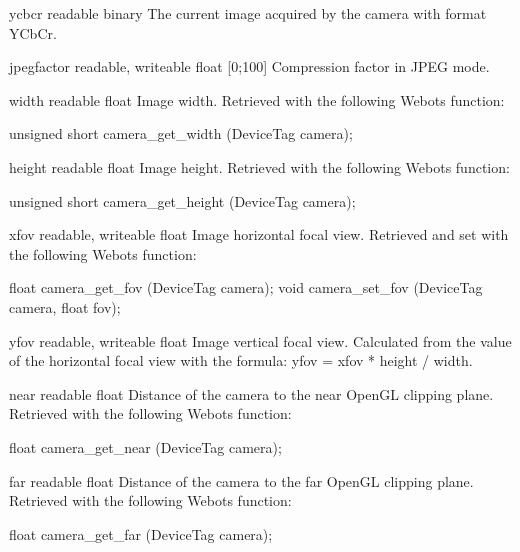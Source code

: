 \begin{itemize}
\begin{attribute}{ycbcr}
  {readable}
  {binary}
  {}
  The current image acquired by the camera with format
  YCbCr.
\end{attribute}

\begin{attribute}{jpegfactor}
  {readable, writeable}
  {float}
  {[0;100]}
  Compression factor in JPEG mode.
\end{attribute}

\begin{attribute}{width}
  {readable}
  {float}
  {}
  Image width. Retrieved with the following Webots
  function:
\begin{cxx}
unsigned short camera_get_width (DeviceTag camera);
\end{cxx}
\end{attribute}

\begin{attribute}{height}
  {readable}
  {float}
  {}
  Image height. Retrieved with the following Webots
  function:
\begin{cxx}
unsigned short camera_get_height (DeviceTag camera);
\end{cxx}
\end{attribute}

\begin{attribute}{xfov}
  {readable, writeable}
  {float}
  {}
  Image horizontal focal view.  Retrieved and set with
  the following Webots function:
\begin{cxx}
float camera_get_fov (DeviceTag camera);
void camera_set_fov (DeviceTag camera, float fov);
\end{cxx}
\end{attribute}

\begin{attribute}{yfov}
  {readable, writeable}
  {float}
  {}
  Image vertical focal view. Calculated from the value of
  the horizontal focal view with the formula: yfov = xfov * height /
  width.
\end{attribute}

\begin{attribute}{near}
  {readable}
  {float}
  {}
  Distance of the camera to the near OpenGL clipping
  plane.  Retrieved with the following Webots function:
\begin{cxx}
float camera_get_near (DeviceTag camera);
\end{cxx}
\end{attribute}

\begin{attribute}{far}
  {readable}
  {float}
  {}
  Distance of the camera to the far OpenGL clipping
  plane.  Retrieved with the following Webots function:
\begin{cxx}
float camera_get_far (DeviceTag camera);
\end{cxx}
\end{attribute}
\end{itemize}

